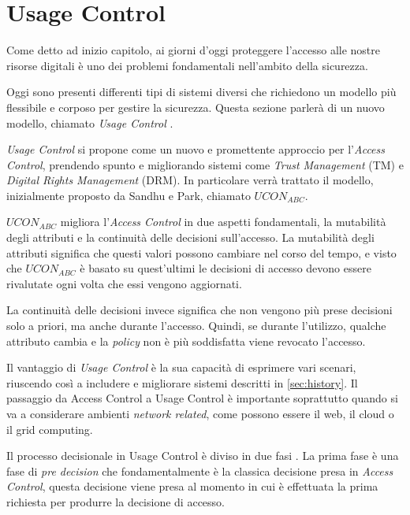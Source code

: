 \section{Usage Control} %
\label{sec:usage_control}
Come detto ad inizio capitolo, ai giorni d'oggi proteggere l'accesso alle nostre risorse digitali è uno dei problemi fondamentali nell'ambito della sicurezza. \par
Oggi sono presenti differenti tipi di sistemi diversi che richiedono un modello più flessibile e corposo per gestire la sicurezza. Questa sezione parlerà di un nuovo modello, chiamato \textit{Usage Control} \cite{SurveyUsageControl}.\\ \par
\textit{Usage Control} si propone come un nuovo e promettente approccio per l'\textit{Access Control}, prendendo spunto e migliorando sistemi come \textit{Trust Management} (TM) e \textit{Digital Rights Management} (DRM). In particolare verrà trattato il modello, inizialmente proposto da Sandhu e Park\cite{SurveyUsageControl}, chiamato $UCON_{ABC}$. \par
$UCON_{ABC}$ migliora l'\textit{Access Control} in due aspetti fondamentali, la mutabilità degli attributi e la continuità delle decisioni sull'accesso. La mutabilità degli attributi significa che questi valori possono cambiare nel corso del tempo, e visto che $UCON_{ABC}$ è basato su quest'ultimi le decisioni di accesso devono essere rivalutate ogni volta che essi vengono aggiornati. \par
La continuità delle decisioni invece significa che non vengono più prese decisioni solo a priori, ma anche durante l'accesso. Quindi, se durante l'utilizzo, qualche attributo cambia e la \textit{policy} non è più soddisfatta viene revocato l'accesso.\\ \par
Il vantaggio di \textit{Usage Control} è la sua capacità di esprimere vari scenari, riuscendo così a includere e migliorare sistemi descritti in \ref{sec:history}.
Il passaggio da Access Control a Usage Control è importante soprattutto quando si va a considerare ambienti \textit{network related}, come possono essere il web, il cloud o il grid computing.\\ \par
Il processo decisionale in Usage Control è diviso in due fasi \cite{UsageControlCloud}. La prima fase è una fase di \textit{pre decision} che fondamentalmente è la classica decisione presa in \textit{Access Control}, questa decisione viene presa al momento in cui è effettuata la prima richiesta per produrre la decisione di accesso.
